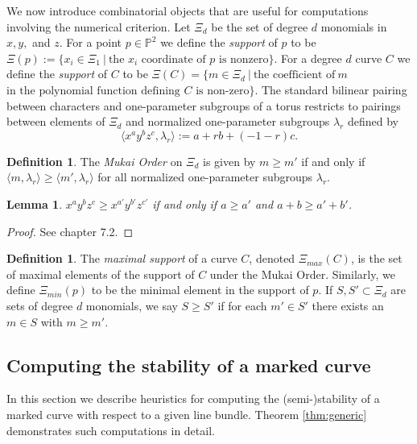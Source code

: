 \documentclass{amsart}
\newcommand{\Pj}{\mathbb{P}}
\numberwithin{equation}{section}
\newtheorem{lemma}[prop]{Lemma}
\theoremstyle{definition}
\newtheorem{defn}[prop]{Definition}
\begin{document}
We now introduce combinatorial objects that are useful for computations involving the numerical criterion. Let $\Xi_d$ be the set of degree $d$ monomials in $x,y,$ and $z$. For a point $p \in \Pj^2$ we define the \textit{support} of $p$ to be $\Xi(p) := \{ x_i \in \Xi_1 \ | \ \text{the $x_i$ coordinate of $p$ is nonzero} \}$. For a degree $d$ curve $C$ we define the \textit{support} of $C$ to be $\Xi(C) = \{ m \in \Xi_d \ | \ \text{the coefficient of} \ m  $ $  \text{in the polynomial function defining $C$ is non-zero} \}$. The standard bilinear pairing between characters and one-parameter subgroups of a torus restricts to pairings between elements of $\Xi_d$ and normalized one-parameter subgroups $\lambda_r$ defined by
$$\langle x^a y^b z^c , \lambda_r \rangle := a + rb + (-1-r)c.$$

\begin{defn}\label{defn:MukaiOrder}
The \textit{Mukai Order} on $\Xi_d$ is given by $m \geq m'$ if and only if $\langle m, \lambda_r \rangle \geq \langle m', \lambda_r \rangle$ for all normalized one-parameter subgroups $\lambda_r$.
\end{defn}

\begin{lemma}
 $x^ay^bz^c \geq x^{a'}y^{b'}z^{c'}$ if and only if $a \geq a'$ and $a+ b \geq a' + b'$.
\end{lemma}

\begin{proof}
See \cite{Muk03} chapter 7.2.
\end{proof}

\begin{defn}\label{defn:maxsup}
The \textit{maximal support} of a curve $C$, denoted $\Xi_{max}(C)$, is the set of maximal elements  of the support of $C$ under the Mukai Order. Similarly, we define $\Xi_{min}(p)$ to be the minimal element in the support of $p$. If $S, S' \subset \Xi_d$ are sets of degree $d$ monomials, we say $S \geq S'$ if for each $m' \in S'$ there exists an $m \in S$ with $m \geq m'.$
\end{defn}

\subsection{Computing the stability of a marked curve} \label{subsec:computing}


In this section we describe heuristics for computing the (semi-)stability of a marked curve with respect to a given line bundle. Theorem \ref{thm:generic} demonstrates such computations in detail.
\end{document}
